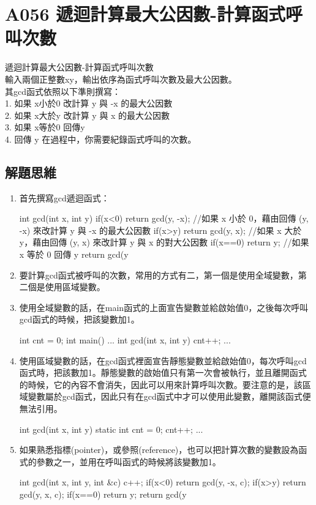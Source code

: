 \section{A056 遞迴計算最大公因數-計算函式呼叫次數}
遞迴計算最大公因數-計算函式呼叫次數\\輸入兩個正整數xy，輸出依序為函式呼叫次數及最大公因數。\\其gcd函式依照以下準則撰寫： \\
1. 如果 x小於0 改計算 y 與 -x 的最大公因數 \\
2. 如果 x大於y 改計算 y 與 x 的最大公因數 \\
3. 如果 x等於0 回傳y \\
4. 回傳 y%
在過程中，你需要紀錄函式呼叫的次數。

\subsection{解題思維}

\begin{enumerate}
	\item
	首先撰寫gcd遞迴函式：
	\begin{inside}
	int gcd(int x, int y) {
		if(x<0) return gcd(y, -x); 
		//如果 x 小於 0，藉由回傳 (y, -x) 來改計算 y 與 -x 的最大公因數
		if(x>y) return gcd(y, x);
		//如果 x 大於 y，藉由回傳 (y, x) 來改計算 y 與 x 的對大公因數 
		if(x==0) return y; //如果 x 等於 0 回傳 y
		return gcd(y%
	}	
	\end{inside}
	\item 要計算gcd函式被呼叫的次數，常用的方式有二，第一個是使用全域變數，第二個是使用區域變數。
	\item 使用全域變數的話，在main函式的上面宣告變數並給啟始值0，之後每次呼叫gcd函式的時候，把該變數加1。
	\begin{inside}
	int cnt = 0;
	int main() {...}
	int gcd(int x, int y) {
		cnt++;
		...
	}
	\end{inside}
	\item 使用區域變數的話，在gcd函式裡面宣告靜態變數並給啟始值0，每次呼叫gcd函式時，把該數加1。靜態變數的啟始值只有第一次會被執行，並且離開函式的時候，它的內容不會消失，因此可以用來計算呼叫次數。要注意的是，該區域變數屬於gcd函式，因此只有在gcd函式中才可以使用此變數，離開該函式便無法引用。
	\begin{inside}
	int gcd(int x, int y) {
		static int cnt = 0;
		cnt++;
		...
	}
	\end{inside}
	\item 如果熟悉指標(pointer)，或參照(reference)，也可以把計算次數的變數設為函式的參數之一，並用在呼叫函式的時候將該變數加1。
	\begin{inside}
	int gcd(int x, int y, int &c) {
		c++;
		if(x<0) return gcd(y, -x, c);
		if(x>y) return gcd(y, x, c);
		if(x==0) return y;
		return gcd(y%
	}	
	\end{inside}
\end{enumerate} 

